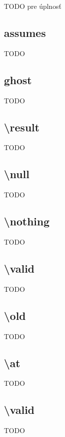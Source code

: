 TODO pre úplnosť

\subsection{assumes}

TODO

\subsection{ghost}

TODO

\subsection{\textbackslash result} \label{chapter:result}

TODO

\subsection{\textbackslash null}

TODO

\subsection{\textbackslash nothing} \label{chapter:nothing}

TODO

\subsection{\textbackslash valid}

TODO

\subsection{\textbackslash old} \label{chapter:old}

TODO

\subsection{\textbackslash at} 

TODO

\subsection{\textbackslash valid} 

TODO

